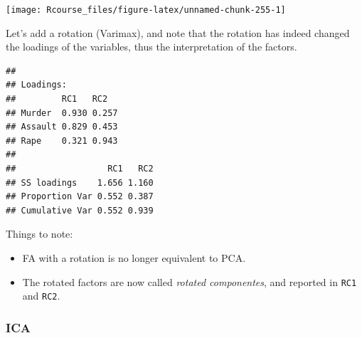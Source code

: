\documentclass[]{book}
\newenvironment{Shaded}{\begin{snugshade}}{\end{snugshade}}
\newcommand{\DataTypeTok}[1]{\textcolor[rgb]{0.13,0.29,0.53}{#1}}
\newcommand{\DecValTok}[1]{\textcolor[rgb]{0.00,0.00,0.81}{#1}}
\newcommand{\FloatTok}[1]{\textcolor[rgb]{0.00,0.00,0.81}{#1}}
\newcommand{\KeywordTok}[1]{\textcolor[rgb]{0.13,0.29,0.53}{\textbf{#1}}}
\newcommand{\NormalTok}[1]{#1}
\newcommand{\OperatorTok}[1]{\textcolor[rgb]{0.81,0.36,0.00}{\textbf{#1}}}
\newcommand{\StringTok}[1]{\textcolor[rgb]{0.31,0.60,0.02}{#1}}
\providecommand{\tightlist}{%
  \setlength{\itemsep}{0pt}\setlength{\parskip}{0pt}}
\theoremstyle{definition}
\theoremstyle{definition}
\theoremstyle{definition}
\theoremstyle{remark}
\begin{document}
\texttt{[image: Rcourse\_files/figure-latex/unnamed-chunk-255-1]}

Let's add a rotation (Varimax), and note that the rotation has indeed changed the loadings of the variables, thus the interpretation of the factors.

\begin{Shaded}
\end{Shaded}

\begin{verbatim}
## 
## Loadings:
##         RC1   RC2  
## Murder  0.930 0.257
## Assault 0.829 0.453
## Rape    0.321 0.943
## 
##                  RC1   RC2
## SS loadings    1.656 1.160
## Proportion Var 0.552 0.387
## Cumulative Var 0.552 0.939
\end{verbatim}

Things to note:

\begin{itemize}
\tightlist
\item
  FA with a rotation is no longer equivalent to PCA.
\item
  The rotated factors are now called \emph{rotated componentes}, and reported in \texttt{RC1} and \texttt{RC2}.
\end{itemize}

\hypertarget{ica}{%
\subsubsection{ICA}\label{ica}}
\end{document}
